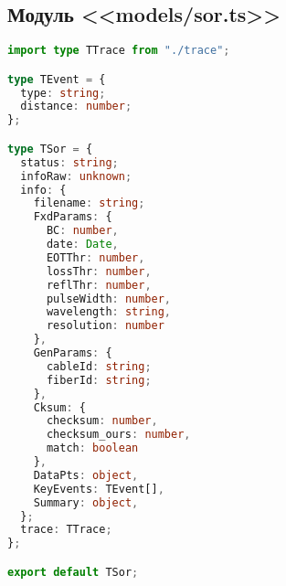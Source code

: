 \subsection{Модуль <<models/sor.ts>>}
\begin{lstlisting}[language=typescript]
import type TTrace from "./trace";

type TEvent = {
  type: string;
  distance: number;
};

type TSor = {
  status: string;
  infoRaw: unknown;
  info: {
    filename: string;
    FxdParams: {
      BC: number,
      date: Date,
      EOTThr: number,
      lossThr: number,
      reflThr: number,
      pulseWidth: number,
      wavelength: string,
      resolution: number
    },
    GenParams: {
      cableId: string;
      fiberId: string;
    },
    Cksum: {
      checksum: number,
      checksum_ours: number,
      match: boolean
    },
    DataPts: object,
    KeyEvents: TEvent[],
    Summary: object,
  };
  trace: TTrace;
};

export default TSor;  
\end{lstlisting}